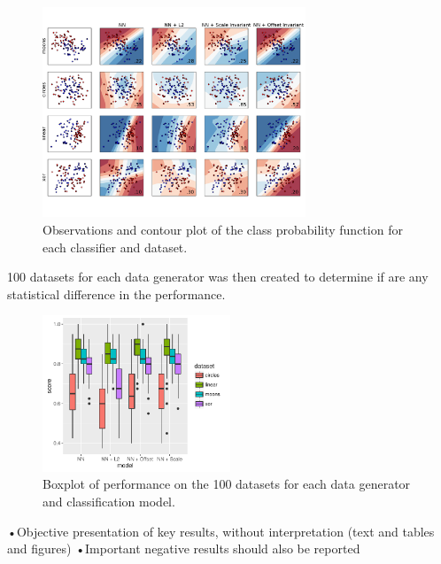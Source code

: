\begin{figure}[h]
	\centering
	\includegraphics[width=0.7\textwidth, trim = 0 2.2cm 0 2cm, clip]{plots/2d_classifier}
	\caption{Observations and contour plot of the class probability function for each classifier and dataset.}
\end{figure}

100 datasets for each data generator was then created to determine if are any statistical difference in the performance.

\begin{figure}[H]
	\centering
	\includegraphics[width=0.5\textwidth]{plots/2d_significant}
	\caption{Boxplot of performance on the 100 datasets for each data generator and classification model.}
\end{figure}


•Objective presentation of key results, without interpretation (text and tables
and figures)
•Important negative results should also be reported
